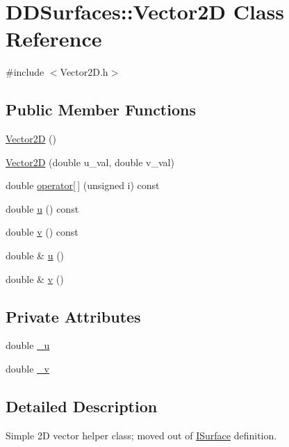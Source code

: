 \hypertarget{class_d_d_surfaces_1_1_vector2_d}{
\section{DDSurfaces::Vector2D Class Reference}
\label{class_d_d_surfaces_1_1_vector2_d}
}


{\ttfamily \#include $<$Vector2D.h$>$}\subsection*{Public Member Functions}
\begin{DoxyCompactItemize}
\item 
\hyperlink{class_d_d_surfaces_1_1_vector2_d_a779bdb4c9b38f3b1c04d8cc56ef78efd}{Vector2D} ()
\item 
\hyperlink{class_d_d_surfaces_1_1_vector2_d_ab41635e717c46f012b11db18f72d145c}{Vector2D} (double u\_\-val, double v\_\-val)
\item 
double \hyperlink{class_d_d_surfaces_1_1_vector2_d_aa7b742f23e71d50c890592e392897f41}{operator\mbox{[}$\,$\mbox{]}} (unsigned i) const 
\item 
double \hyperlink{class_d_d_surfaces_1_1_vector2_d_a5b394ade28f5c03eaa174902de6fe079}{u} () const 
\item 
double \hyperlink{class_d_d_surfaces_1_1_vector2_d_a146ba717d65ee406f9fa799780e97974}{v} () const 
\item 
double \& \hyperlink{class_d_d_surfaces_1_1_vector2_d_a366947f28bc5da5b5581186158321489}{u} ()
\item 
double \& \hyperlink{class_d_d_surfaces_1_1_vector2_d_aff280a5b8f8a363199965bc609a02ee0}{v} ()
\end{DoxyCompactItemize}
\subsection*{Private Attributes}
\begin{DoxyCompactItemize}
\item 
double \hyperlink{class_d_d_surfaces_1_1_vector2_d_a168e75ab549555cd365ce3e3e3a48093}{\_\-u}
\item 
double \hyperlink{class_d_d_surfaces_1_1_vector2_d_ac52fd163a951a5a29978eb8dad3fc07e}{\_\-v}
\end{DoxyCompactItemize}


\subsection{Detailed Description}
Simple 2D vector helper class; moved out of \hyperlink{class_d_d_surfaces_1_1_i_surface}{ISurface} definition. 

